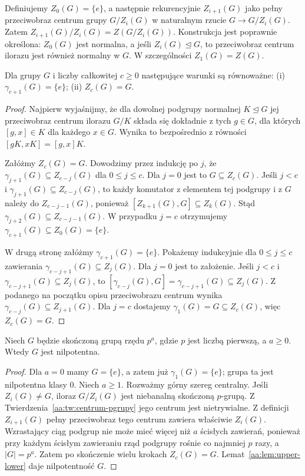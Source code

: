 \begin{definicja}
\label{aa:def:gorny-centralny}
Definiujemy $Z_0(G)=\{e\}$, a następnie rekurencyjnie
$Z_{i+1}(G)$ jako pełny przeciwobraz centrum grupy $G/Z_i(G)$
w naturalnym rzucie $G\to G/Z_i(G)$.
Zatem $Z_{i+1}(G)/Z_i(G)=Z(G/Z_i(G))$.
Konstrukcja jest poprawnie określona: $Z_0(G)$ jest normalna,
a jeśli $Z_i(G)\trianglelefteq G$, to przeciwobraz centrum
ilorazu jest również normalny w $G$.
W szczególności $Z_1(G)=Z(G)$.
\end{definicja}
\begin{lemat}
\label{aa:lem:upper-lower}
Dla grupy $G$ i liczby całkowitej $c\ge0$ następujące warunki
są równoważne: (i) $\gamma_{c+1}(G)=\{e\}$;
(ii) $Z_c(G)=G$.
\end{lemat}
\begin{proof}
Najpierw wyjaśnijmy, że dla dowolnej podgrupy normalnej
$K\trianglelefteq G$ jej przeciwobraz centrum ilorazu
$G/K$ składa się dokładnie z tych $g\in G$, dla których
$[g,x]\in K$ dla każdego $x\in G$.
Wynika to bezpośrednio z równości
$[gK,xK]=[g,x]K$.

Załóżmy $Z_c(G)=G$. Dowodzimy przez indukcję po $j$, że
$\gamma_{j+1}(G)\subseteq Z_{c-j}(G)$ dla $0\le j\le c$.
Dla $j=0$ jest to $G\subseteq Z_c(G)$.
Jeśli $j<c$ i $\gamma_{j+1}(G)\subseteq Z_{c-j}(G)$,
to każdy komutator z elementem tej podgrupy i z $G$
należy do $Z_{c-j-1}(G)$, ponieważ
$[Z_{k+1}(G),G]\subseteq Z_k(G)$.
Stąd $\gamma_{j+2}(G)\subseteq Z_{c-j-1}(G)$.
W przypadku $j=c$ otrzymujemy $\gamma_{c+1}(G)\subseteq Z_0(G)=\{e\}$.

W drugą stronę załóżmy $\gamma_{c+1}(G)=\{e\}$.
Pokażemy indukcyjnie dla $0\le j\le c$ zawierania
$\gamma_{c-j+1}(G)\subseteq Z_j(G)$.
Dla $j=0$ jest to założenie. Jeśli $j<c$ i
$\gamma_{c-j+1}(G)\subseteq Z_j(G)$,
to $[\gamma_{c-j}(G),G]=\gamma_{c-j+1}(G)\subseteq Z_j(G)$.
Z podanego na początku opisu przeciwobrazu centrum
wynika $\gamma_{c-j}(G)\subseteq Z_{j+1}(G)$.
Dla $j=c$ dostajemy $\gamma_1(G)=G\subseteq Z_c(G)$,
więc $Z_c(G)=G$.
\end{proof}

\begin{twierdzenie}
\label{aa:tw:pgroup-nilpotent}
Niech $G$ będzie skończoną grupą rzędu $p^a$, gdzie $p$
jest liczbą pierwszą, a $a\ge0$. Wtedy $G$ jest nilpotentna.
\end{twierdzenie}
\begin{proof}
Dla $a=0$ mamy $G=\{e\}$, a zatem już
$\gamma_1(G)=\{e\}$; grupa ta jest nilpotentna klasy $0$.
Niech $a\ge1$. Rozważmy górny szereg centralny.
Jeśli $Z_i(G)\ne G$, iloraz $G/Z_i(G)$ jest niebanalną
skończoną $p$-grupą. Z Twierdzenia~\ref{aa:tw:centrum-pgrupy}
jego centrum jest nietrywialne. Z definicji $Z_{i+1}(G)$
pełny przeciwobraz tego centrum zawiera właściwie $Z_i(G)$.
Wzrastający ciąg podgrup nie może mieć więcej niż $a$
ścisłych zawierań, ponieważ przy każdym ścisłym zawieraniu
rząd podgrupy rośnie co najmniej $p$ razy, a $|G|=p^a$.
Zatem po skończenie wielu krokach $Z_c(G)=G$.
Lemat~\ref{aa:lem:upper-lower} daje nilpotentność $G$.
\end{proof}

